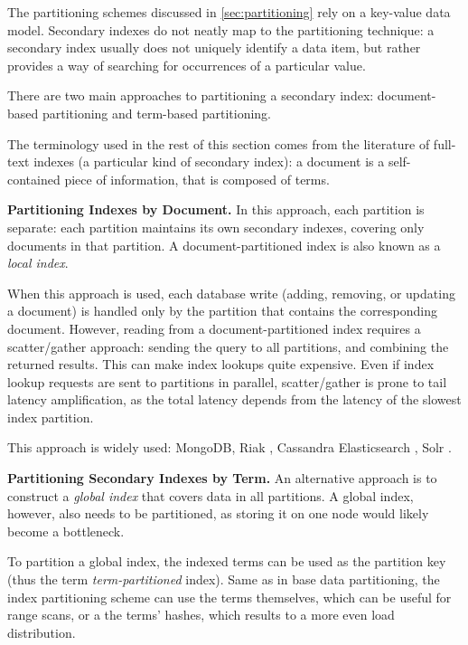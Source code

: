 The partitioning schemes discussed in \ref{sec:partitioning} rely on a key-value data model.
Secondary indexes do not neatly map to the partitioning technique:
a secondary index usually does not uniquely identify a data item, but rather provides a way of searching for occurrences
of a particular value.

There are two main approaches to partitioning a secondary index:
document-based partitioning and term-based partitioning.

The terminology used in the rest of this section comes from the literature of full-text indexes (a particular kind of secondary index):
a document is a self-contained piece of information, that is composed of terms.

\bigskip

\noindent
\textbf{Partitioning Indexes by Document.}
In this approach, each partition is separate:
each partition maintains its own secondary indexes, covering only documents in that partition.
A document-partitioned index is also known as a \textit{local index}.

When this approach is used, each database write (adding, removing, or updating a document) is handled only by the
partition that contains the corresponding document.
However, reading from a document-partitioned index requires a scatter/gather approach:
sending the query to all partitions, and combining the returned results.
This can make index lookups quite expensive.
Even if index lookup requests are sent to partitions in parallel, scatter/gather is prone to tail latency amplification,
as the total latency depends from the latency of the slowest index partition.

This approach is widely used: MongoDB, Riak \cite{riakv:secondaryindexes}, Cassandra \cite{cassandra:secondaryindexing}
Elasticsearch \cite{elastic:docrouting}, Solr \cite{solr:indexsharding}.

\bigskip

\noindent
\textbf{Partitioning Secondary Indexes by Term.}
An alternative approach is to construct a \textit{global index} that covers data in all partitions.
A global index, however, also needs to be partitioned, as storing it on one node would likely become a bottleneck.

To partition a global index, the indexed terms can be used as the partition key (thus the term \textit{term-partitioned}
index).
Same as in base data partitioning, the index partitioning scheme can use the terms themselves, which can be useful for
range scans, or a the terms' hashes, which results to a more even load distribution.

